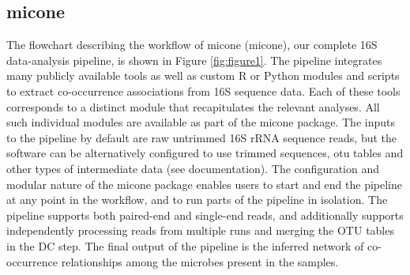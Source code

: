   \subsection*{\ac{micone}}
  \vspace{-5mm}
  The flowchart describing the workflow of \ac{micone} (\acl{micone}), our complete 16S data-analysis pipeline, is shown in Figure \ref{fig:figure1}.
  The pipeline integrates many publicly available tools as well as custom R or Python modules and scripts to extract co-occurrence associations from 16S sequence data.
  Each of these tools corresponds to a distinct module that recapitulates the relevant analyses.
  All such individual modules are available as part of the \ac{micone} package.
  The inputs to the pipeline by default are raw untrimmed 16S rRNA sequence reads, but the software can be alternatively configured to use trimmed sequences, \ac{otu} tables and other types of intermediate data (see documentation).
  The configuration and modular nature of the \ac{micone} package enables users to start and end the pipeline at any point in the workflow, and to run parts of the pipeline in isolation.
  The pipeline supports both paired-end and single-end reads, and additionally supports independently processing reads from multiple runs and merging the OTU tables in the DC step.
  The final output of the pipeline is the inferred network of co-occurrence relationships among the microbes present in the samples.

